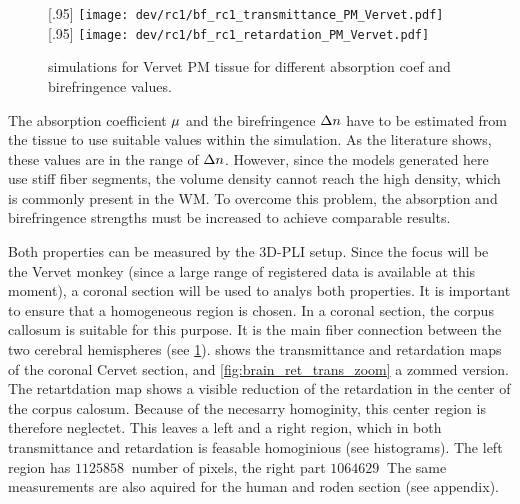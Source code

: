 % 
% 
% 
\begin{figure}[!tp]
\centering
{}[.95\textwidth]{
\texttt{[image: dev/rc1/bf\_rc1\_transmittance\_PM\_Vervet.pdf]}} %
{}[.95\textwidth]{
\texttt{[image: dev/rc1/bf\_rc1\_retardation\_PM\_Vervet.pdf]}
}
\caption{simulations for Vervet PM tissue for different absorption coef and birefringence values.}
\label{fig:parameterModelSim}
\end{figure}
% 
The absorption coefficient $\textnormal{$\mu$}{}$ and the birefringence $\textnormal{$\Delta n$}{}$ have to be estimated from the tissue to use suitable values within the simulation.
As the literature shows, these values are in the range of \dummy{}\TODO{!!!} $\textnormal{$\Delta n$}{}$.
However, since the models generated here use stiff fiber segments, the volume density cannot reach the high density, which is commonly present in the \ac{WM}.
To overcome this problem, the absorption and birefringence strengths must be increased to achieve comparable results.
\par
% 
Both properties can be measured by the \ac{3D-PLI} setup.
Since the focus will be the Vervet monkey (since a large range of registered data is available at this moment), a coronal section will be used to analys both properties.
It is important to ensure that a homogeneous region is chosen.
In a coronal section, the corpus callosum is suitable for this purpose. It is the main fiber connection between the two cerebral hemispheres (see \cref{fig:parameterModelSim}).
% 
% 
 shows the transmittance and retardation maps of the coronal Cervet section, and \ref{fig:brain_ret_trans_zoom} a zommed version.
The retartdation map shows a visible reduction of the retardation in the center of the corpus calosum.
Because of the necesarry homoginity, this center region is therefore neglectet.
This leaves a left and a right region, which in both transmittance and retardation is feasable homoginious (see histograms).
The left region has $\SI{1125858}{}$ number of pixels, the right part $\SI{1064629}{}$
% 
The same measurements are also aquired for the human and roden section (see appendix). 
% 
% 
